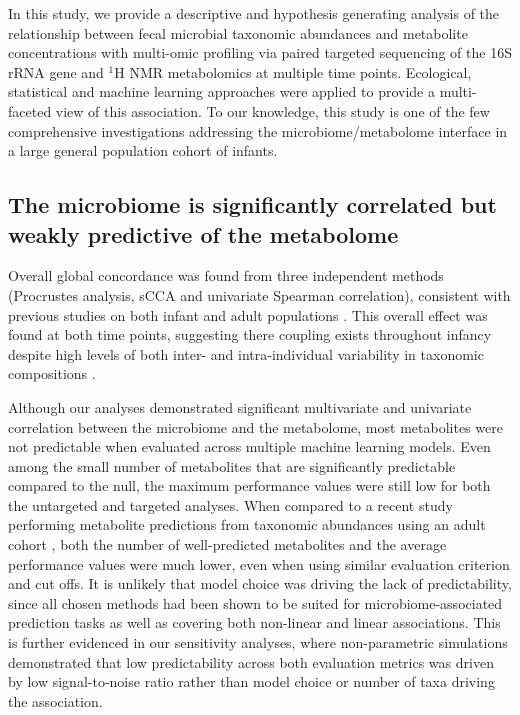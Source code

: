In this study, we provide a descriptive and hypothesis generating analysis of  the relationship between fecal microbial taxonomic abundances and metabolite concentrations with multi-omic profiling via paired targeted sequencing of the 16S rRNA gene and $^1$H NMR metabolomics at multiple time points. Ecological, statistical and machine learning approaches were applied to provide a multi-faceted view of this association. To our knowledge, this study is one of the few comprehensive investigations addressing the microbiome/metabolome interface in a large general population cohort of infants. 

\subsection{The microbiome is significantly correlated but weakly predictive of the metabolome}

Overall global concordance was found from three independent methods (Procrustes analysis, sCCA and univariate Spearman correlation), consistent with previous studies on both infant \cite{ayeni2018infant, kisuse2018urban} and adult populations \cite{lloyd-price2019multiomics, mchardy2013integrative}. This overall effect was found at both time points, suggesting there coupling exists throughout infancy despite high levels of both inter- and intra-individual variability in taxonomic compositions \cite{backhed2015dynamics}. 

Although our analyses demonstrated significant multivariate and univariate correlation between the microbiome and the metabolome, most metabolites were not predictable when evaluated across multiple machine learning models. Even among the small number of metabolites that are significantly predictable compared to the null, the maximum performance values were still low for both the untargeted and targeted analyses. When compared to a recent study performing metabolite predictions from taxonomic abundances using an adult cohort \cite{mallick2019predictive}, both the number of well-predicted metabolites and the average performance values were much lower, even when using similar evaluation criterion and cut offs. It is unlikely that model choice was driving the lack of predictability, since all chosen methods had been shown to be suited for microbiome-associated prediction tasks \cite{zhou2019review, pasolli2016machine} as well as covering both non-linear and linear associations. This is further evidenced in our sensitivity analyses, where non-parametric simulations demonstrated that low predictability across both evaluation metrics was driven by low signal-to-noise ratio rather than model choice or number of taxa driving the association.

